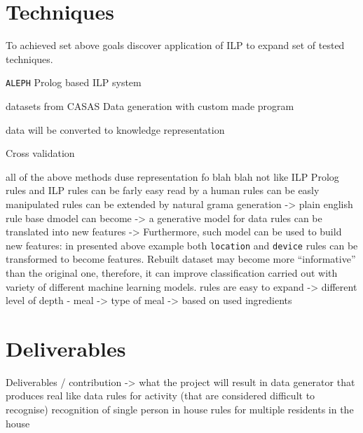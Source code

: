 \documentclass[12pt, a4paper, pdflatex, leqno, twoside, openright]{report}
\begin{document}
\section{Techniques}
To achieved set above goals discover application of ILP to expand set of tested techniques.

\texttt{ALEPH} Prolog based ILP system

datasets from CASAS
Data generation with custom made program

data will be converted to knowledge representation

Cross validation


all of the above methods duse representation fo blah blah not like ILP
Prolog rules and ILP
rules can be farly easy read by a human
rules can be easly manipulated
rules can be extended by natural grama generation -> plain english
rule base dmodel can become -> a generative model for data
rules can be translated into new features -> Furthermore, such model can be used to build new features: in presented above example both \texttt{location} and \texttt{device} rules can be transformed to become features. Rebuilt dataset may become more ``informative'' than the original one, therefore, it can improve classification carried out with variety of different machine learning models.
rules are easy to expand -> different level of depth - meal -> type of meal -> based on used ingredients


\section{Deliverables}
Deliverables / contribution -> what the project will result in
data generator that produces real like data
rules for activity (that are considered difficult to recognise) recognition of single person in house
rules for multiple residents in the house
\end{document}
